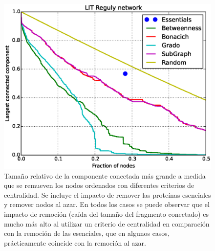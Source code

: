 \begin{figure}
\includegraphics[scale = 0.30]{figuras/LIT_Reguly_b} 
\caption{Tamaño relativo de la componente conectada más grande a medida que se remueven los nodos ordenados con diferentes criterios de centralidad. Se incluye el impacto de remover las proteínas esenciales y remover nodos al azar. En todos los casos se puede observar que el impacto de remoción (caída del tamaño del fragmento conectado) es mucho más alto al utilizar un criterio de centralidad en comparación con la remoción de las esenciales, que en algunos casos, prácticamente coincide con la remoción al azar.}
\label{fig:remocion}
\end{figure}


